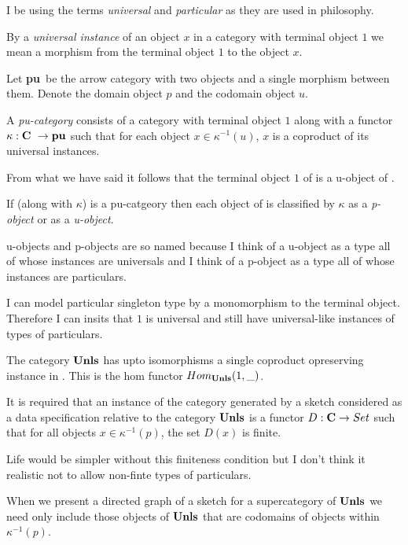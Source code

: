 \documentclass[10pt,a4paper]{article}
\theoremstyle{remark}
\renewcommand{\term}[1]{\textit{#1}}  %
\begin{document}
\begin{aside}
\newcommand{\puarrowcat}{\textbf{pu}}

I be using the terms \term{universal} and \term{particular} as they are used in philosophy.

By a \textit{universal instance} of an object $x$ in a category with terminal object $1$ we mean a morphism from the terminal object $1$ to the object $x$.

Let \puarrowcat\  be the arrow category with two objects and a single morphism between them.
Denote the domain object $p$ and  the codomain object $u$.

A \term{pu-category} consists of a category \catcw with terminal object $1$ 
along with  a functor $\kappa: \catcw \morph \puarrowcat$ 
such that for each object $x \in \kappa^{-1}(u)$, $x$ is a coproduct of its universal instances.

From what we have said it follows that the terminal object $1$ of \catcw is a u-object of \catc.

If \catcw (along with $\kappa$) is a pu-catgeory then each object of \catcw is
classified by $\kappa$  as a \term{p-object} or as a \term{u-object}. 

u-objects and p-objects are so named because I
think of a u-object as a type all of whose instances are universals and I think of a p-object as a type
all of whose instances are particulars. 
\end{aside}

\begin{newtt}
I can model particular singleton type by a monomorphism to the terminal object. Therefore
I can insits that $1$ is universal and still have universal-like instances of types of particulars.
\end{newtt}

The category $\textbf{Unls}$ has upto isomorphisms a single coproduct opreserving instance in \Set. 
This is the hom functor $Hom_{\textbf{Unls}}(1,\_)$.

It is required that an instance of the category \catcw  generated by a sketch considered as a data specification relative to  the category $\textbf{Unls}$ is a functor $D: \textbf{C} \rightarrow Set$ such
that for all objects $x \in \kappa^{-1}(p)$, the set $D(x)$ is finite.

Life would be simpler without this finiteness condition but I don't think it realistic not to allow non-finte types of particulars.

When we present a directed graph of a sketch for a supercategory of $\textbf{Unls}$ we need only include those
objects of $\textbf{Unls}$ that are codomains of objects within  $\kappa^{-1}(p)$.
\end{document}
